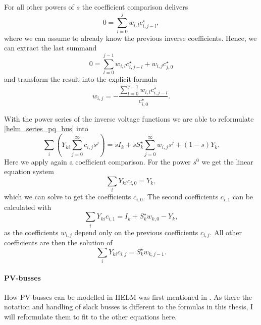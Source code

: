 For all other powers of $s$ the coefficient comparison delivers
\begin{equation}
	0 = \sum_{l = 0}^j w_{i,l} c_{i,j - l}^\star,
\end{equation}
where we can assume to already know the previous inverse coefficients. Hence, we can extract the last summand
\begin{equation}
	0 = \sum_{l = 0}^{j - 1} w_{i,l} c_{i,j - l}^\star + w_{i,j} c_{j,0}^\star
\end{equation}
and transform the result into the explicit formula 
\begin{equation}
	w_{i,j} = - \frac{\sum_{l = 0}^{j - 1} w_{i,l} c_{i,j - l}^\star}{c_{i,0}^\star}.
\end{equation}

With the power series of the inverse voltage functions we are able to reformulate \eqref{helm_series_pq_bus} into
\begin{equation}
	\sum_i \left( Y_{ki} \sum_{j = 0}^\infty c_{i,j} s^j \right) = s I_k + s S_k^\star \sum_{j = 0}^\infty w_{i,j} s^j + (1 - s) Y_k.
\end{equation}
Here we apply again a coefficient comparison. For the power $s^0$ we get the linear equation system
\begin{equation}
	\sum_i Y_{ki} c_{i,0} = Y_k,
	\label{eq:helm_first_coefficients}
\end{equation}
which we can solve to get the coefficients $c_{i,0}$. The second coefficients $c_{i,1}$ can be calculated with
\begin{equation}
	\sum_i Y_{ki} c_{i,1} = I_k + S_k^\star w_{k,0} - Y_k,
	\label{eq:helm_second_coefficients}
\end{equation}
as the coefficients $w_{i,j}$ depend only on the previous coefficients $c_{i,j}$. All other coefficients are then the solution of
\begin{equation}
	\sum_i Y_{ki} c_{i,j} = S_k^\star w_{k,j - 1}.
	\label{eq:helm_other_coefficients}
\end{equation}

\paragraph{PV-busses}

How PV-busses can be modelled in HELM was first mentioned in \citep{helmPV}. As there the notation and handling of slack busses is different to the formulas in this thesis, I will reformulate them to fit to the other equations here.

